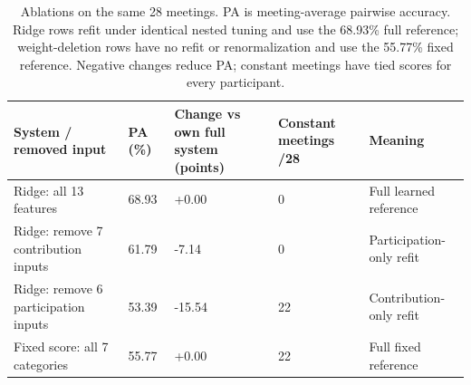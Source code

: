 \documentclass[journal]{IEEEtran}
\begin{document}
\begin{table}[t]
\caption{Ablations on the same 28 meetings. PA is meeting-average pairwise accuracy. Ridge rows refit under identical nested tuning and use the 68.93\% full reference; weight-deletion rows have no refit or renormalization and use the 55.77\% fixed reference. Negative changes reduce PA; constant meetings have tied scores for every participant.}
\label{tab:8}
\centering\footnotesize
\setlength{\tabcolsep}{3pt}
\renewcommand{\arraystretch}{1.13}
\begin{tabular}{p{}p{}p{}p{}p{}}
\toprule
{\raggedright System / removed input\par} & {\raggedright PA (\%)\par} & {\raggedright Change vs own full system (points)\par} & {\raggedright Constant meetings /28\par} & {\raggedright Meaning\par} \\
\midrule
{\raggedright Ridge: all 13 features\par} & {\raggedright 68.93\par} & {\raggedright +0.00\par} & {\raggedright 0\par} & {\raggedright Full learned reference\par} \\
{\raggedright Ridge: remove 7 contribution inputs\par} & {\raggedright 61.79\par} & {\raggedright -7.14\par} & {\raggedright 0\par} & {\raggedright Participation-only refit\par} \\
{\raggedright Ridge: remove 6 participation inputs\par} & {\raggedright 53.39\par} & {\raggedright -15.54\par} & {\raggedright 22\par} & {\raggedright Contribution-only refit\par} \\
{\raggedright Fixed score: all 7 categories\par} & {\raggedright 55.77\par} & {\raggedright +0.00\par} & {\raggedright 22\par} & {\raggedright Full fixed reference\par} \\

\end{tabular}
\end{table}
\end{document}
